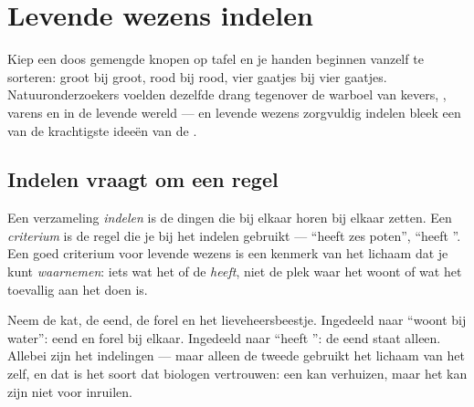 \chapter{Levende wezens indelen}\label{ch:g3:sorting-living-things}

Kiep een doos gemengde knopen op tafel en je handen beginnen vanzelf te
sorteren: groot bij groot, rood bij rood, vier gaatjes bij vier
gaatjes. Natuuronderzoekers voelden dezelfde drang tegenover de warboel
van kevers, , varens en  in de levende wereld --- en
levende wezens zorgvuldig indelen bleek een van de krachtigste ideeën
van de .

\section{Indelen vraagt om een regel}

\begin{definition}\label{def:g3:sorting-living-things:criterion}
Een verzameling \emph{indelen} is de dingen die bij
elkaar horen bij elkaar zetten. Een \emph{criterium}
is de regel die je bij het indelen gebruikt --- ``heeft zes poten'',
``heeft ''. Een goed criterium voor levende wezens is een kenmerk
van het lichaam dat je kunt \emph{waarnemen}: iets wat het  of de
 \emph{heeft}, niet de plek waar het woont of wat het toevallig
aan het doen is.
\end{definition}

\begin{example}\label{ex:g3:sorting-living-things:two}
Neem de kat, de eend, de forel en het lieveheersbeestje. Ingedeeld naar
``woont bij water'': eend en forel bij elkaar. Ingedeeld naar ``heeft
'': de eend staat alleen. Allebei zijn het indelingen --- maar
alleen de tweede gebruikt het lichaam van het  zelf, en dat is het
soort dat biologen vertrouwen: een  kan verhuizen, maar het kan
zijn  niet voor  inruilen.
\end{example}

